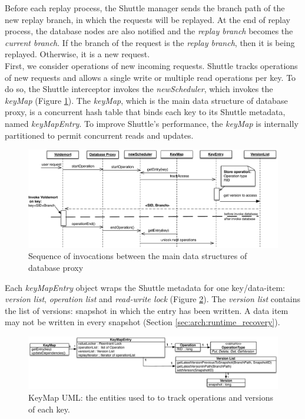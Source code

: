 Before each replay process, the Shuttle manager sends the branch path of the new replay branch, in which the requests will be replayed. At the end of replay process, the database nodes are also notified and the \textit{replay branch} becomes the \textit{current branch}. If the branch of the request is the \textit{replay branch}, then it is being replayed. Otherwise, it is a new request.\\


First, we consider operations of new incoming requests. Shuttle tracks operations of new requests and allows a single write or multiple read operations per key. To do so, the Shuttle interceptor invokes the \emph{newScheduler}, which invokes the \emph{keyMap} (Figure \ref{fig:sequence_normal}). The \emph{keyMap}, which is the main data structure of database proxy, is a concurrent hash table that binds each  key to its Shuttle metadata, named \emph{keyMapEntry}. To improve Shuttle's performance, the \emph{keyMap} is internally partitioned to permit concurrent reads and updates.

\begin{figure}
  \centering
  \includegraphics[width=\textwidth]{arch/operation_database}
  \caption{Sequence of invocations between the main data structures of database proxy }
  \label{fig:sequence_normal}
\end{figure}


Each \emph{keyMapEntry} object wraps the Shuttle metadata for one key/data-item: \emph{version list}, \emph{operation list} and \emph{read-write lock} (Figure \ref{fig:keymap}). The \emph{version list} contains the list of versions: snapshot in which the entry has been written. A data item may not be written in every snapshot (Section \ref{sec:arch:runtime_recovery}). 

\begin{figure}
  \centering
  \includegraphics[width=\textwidth]{arch/keymap}
  \caption{KeyMap UML: the entities used to to track operations and versions of each key.}
  \label{fig:keymap}
\end{figure}


